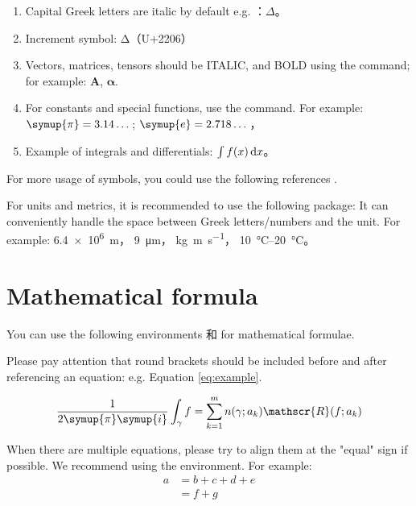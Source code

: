 \begin{enumerate}
  \item Capital Greek letters are italic by default e.g. ：$\Delta$。
  \item Increment symbol: $\increment$（U+2206）
  \item Vectors, matrices, tensors should be ITALIC, and BOLD using the  command; for example: $\symbf{A}$, $\symbf{\alpha}$.
  \item For constants and special functions, use the  command. For example:
    $\symup{\pi} = 3.14\dots$; $\symup{e} = 2.718\dots$，
  \item Example of integrals and differentials: $\int f(x) \mathop{}\!\mathrm{d} x$。
\end{enumerate}

For more usage of symbols, you could use the following references
\href{http://mirrors.ctan.org/macros/latex/contrib/unicode-math/unicode-math.pdf}{}
\href{http://mirrors.ctan.org/macros/latex/contrib/unicode-math/unimath-symbols.pdf}{}.

For units and metrics, it is recommended to use the following package:
\href{http://mirrors.ctan.org/macros/latex/contrib/siunitx/siunitx.pdf}{}
It can conveniently handle the space between Greek letters/numbers and the unit. For example:
\SI{6.4e6}{m}，
\SI{9}{\micro\meter}，
\si{kg.m.s^{-1}}，
\SIrange{10}{20}{\degreeCelsius}。



\section{Mathematical formula}

You can use the following environments  和  for mathematical formulae.

Please pay attention that round brackets should be included before and after referencing an equation: e.g. Equation \eqref{eq:example}.

\begin{equation}
  \frac{1}{2 \symup{\pi} \symup{i}} \int_\gamma f = \sum_{k=1}^m n(\gamma; a_k) \mathscr{R}(f; a_k)
  \label{eq:example}
\end{equation}

When there are multiple equations, please try to align them at the "equal" sign if possible. We recommend using the  environment.
For example:
\begin{align}
  a & = b + c + d + e \\
    & = f + g
\end{align}


